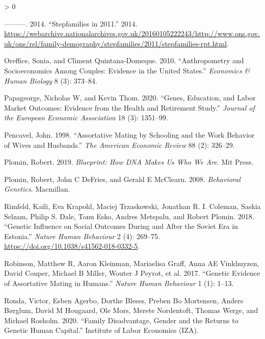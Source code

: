 \documentclass[
]{article}
\newlength{\cslhangindent}
\newenvironment{CSLReferences}[2] %
 {%
  \setlength{\parindent}{0pt}
  \ifodd #1 \everypar{\setlength{\hangindent}{\cslhangindent}}\ignorespaces\fi
  \ifnum #2 > 0
  \setlength{\parskip}{#2\baselineskip}
  \fi
 }%
 {}
\begin{document}
\begin{CSLReferences}{1}{0}
\leavevmode\hypertarget{ref-ons2011stepfamilies}{}%
---------. 2014. {``Stepfamilies in 2011.''} 2014. \url{https://webarchive.nationalarchives.gov.uk/20160105222243/http://www.ons.gov.uk/ons/rel/family-demography/stepfamilies/2011/stepfamilies-rpt.html}.

\leavevmode\hypertarget{ref-oreffice2010anthropometry}{}%
Oreffice, Sonia, and Climent Quintana-Domeque. 2010. {``Anthropometry and Socioeconomics Among Couples: Evidence in the United States.''} \emph{Economics \& Human Biology} 8 (3): 373--84.

\leavevmode\hypertarget{ref-papageorge2020genes}{}%
Papageorge, Nicholas W, and Kevin Thom. 2020. {``Genes, Education, and Labor Market Outcomes: Evidence from the Health and Retirement Study.''} \emph{Journal of the European Economic Association} 18 (3): 1351--99.

\leavevmode\hypertarget{ref-pencavel1998assortative}{}%
Pencavel, John. 1998. {``Assortative Mating by Schooling and the Work Behavior of Wives and Husbands.''} \emph{The American Economic Review} 88 (2): 326--29.

\leavevmode\hypertarget{ref-plomin2019blueprint}{}%
Plomin, Robert. 2019. \emph{Blueprint: How DNA Makes Us Who We Are}. Mit Press.

\leavevmode\hypertarget{ref-plomin2008behavioral}{}%
Plomin, Robert, John C DeFries, and Gerald E McClearn. 2008. \emph{Behavioral Genetics}. Macmillan.

\leavevmode\hypertarget{ref-Rimfeld_2018}{}%
Rimfeld, Kaili, Eva Krapohl, Maciej Trzaskowski, Jonathan R. I. Coleman, Saskia Selzam, Philip S. Dale, Tonu Esko, Andres Metspalu, and Robert Plomin. 2018. {``Genetic Influence on Social Outcomes During and After the Soviet Era in Estonia.''} \emph{Nature Human Behaviour} 2 (4): 269--75. \url{https://doi.org/10.1038/s41562-018-0332-5}.

\leavevmode\hypertarget{ref-robinson2017genetic}{}%
Robinson, Matthew R, Aaron Kleinman, Mariaelisa Graff, Anna AE Vinkhuyzen, David Couper, Michael B Miller, Wouter J Peyrot, et al. 2017. {``Genetic Evidence of Assortative Mating in Humans.''} \emph{Nature Human Behaviour} 1 (1): 1--13.

\leavevmode\hypertarget{ref-ronda2020family}{}%
Ronda, Victor, Esben Agerbo, Dorthe Bleses, Preben Bo Mortensen, Anders Børglum, David M Hougaard, Ole Mors, Merete Nordentoft, Thomas Werge, and Michael Rosholm. 2020. {``Family Disadvantage, Gender and the Returns to Genetic Human Capital.''} Institute of Labor Economics (IZA).


\end{CSLReferences}
\end{document}
